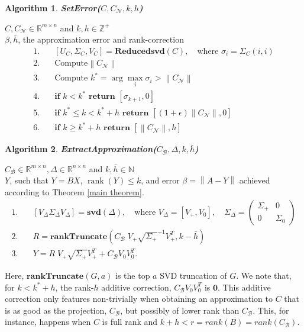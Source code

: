 \documentclass[11pt]{article}
\newcommand{\rank}{\operatorname{rank}}
\newtheorem{alg}{Algorithm}
\def\reals{\mathbb{R}}
\newcommand{\norm}[1]{\left\|#1\right\|}
\newcommand{\B}{\mathcal{B}}
\newcommand{\N}{\mathcal{N}}
\begin{document}
\begin{framed}
\begin{alg}\label{alg:seterr}
{\bf SetError($C, C_{\N}, k, h$) }
\end{alg}
 $C, C_{\N} \in \reals^{m \times n}$ and $k, h \in \mathbb{Z^+}$\\
 $\beta, \bar h$, the approximation error and rank-correction
%
\begin{align*}
1. \quad& [U_C, \Sigma_C, V_C] = \textbf{Reducedsvd}(C), \quad \text{where } \sigma_i = \Sigma_C (i, i) \\
2. \quad& \text{Compute} \norm{C_{\N}}\\
3. \quad& \text{Compute } k^* = \arg \max_i \sigma_i > \norm{C_{\N}} \\
4. \quad& \textbf{if } k < k^* \textbf{ return } [\sigma_{k+1}, 0] \\
5. \quad& \textbf{if } k^* \leq k < k^* + h \textbf{ return } [(1 + \epsilon) \norm{C_{\N}}, 0] \\
6. \quad& \textbf{if } k \geq k^* + h \textbf{ return } [\norm{C_{\N}}, h] 
\end{align*}
%
\end{framed}


\begin{framed}
\begin{alg}\label{alg:extractApprox}
{\bf ExtractApproximation($C_{\B}, \Delta, k, \bar h$) }
\end{alg}
 $C_{\B} \in \reals^{m \times n}, \Delta \in \reals^{n \times n}$ and $k, \bar h \in \mathbb{N}$\\
 $Y$, such that $Y=BX$, $\rank(Y) \leq k$, and error $\beta = \norm{A - Y}$ achieved according to Theorem \ref{main theorem}.
%
\begin{align*}
1. \quad& [V_{\Delta} \Sigma_{\Delta} V_{\Delta}] = \textbf{svd} (\Delta), \quad \text{where } V_{\Delta} = [V_+, V_0], \quad \Sigma_{\Delta} = \begin{pmatrix} \Sigma_+ & 0 \\ 0 & \Sigma_0 \end{pmatrix}\\
2. \quad& R = \textbf{rankTruncate}\left( C_{\B} \; V_+ \sqrt{\Sigma_+}^{-1} V_+ ^T, k - \bar h \right) \\
3. \quad& Y = R \; V_+ \sqrt{\Sigma_+} V_+ ^T  + C_{\B} V_0 V_0 ^T.
\end{align*}
%
\end{framed}
\noindent Here, $\textbf{rankTruncate}(G, a)$ is the top $a$ SVD truncation of $G$. We note that, for $k < k^* + h$, the rank-$h$ additive correction, $C_{\B} V_0 V_0 ^T$ is $\mathbf{0}$. This additive correction only features non-trivially when obtaining an approximation to $C$ that is as good as the projection, $C_{\B}$, but possibly of lower rank than $C_{\B}$. This, for instance, happens when $C$ is full rank and $k + h < r = rank(B) = rank(C_{\B})$. 
\end{document}
